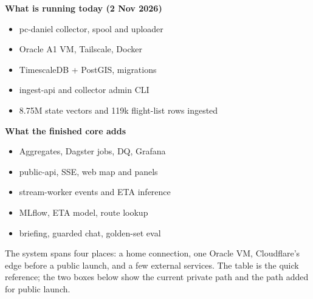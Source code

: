 \documentclass[10.5pt]{article}
\begin{document}
\begin{minipage}[t]{0.49\linewidth}
\begin{card}
{\bfseries What is running today (2 Nov 2026)}
\begin{itemize}[leftmargin=1.05em,itemsep=1.5pt,topsep=2pt]
  \item pc-daniel collector, spool and uploader
  \item Oracle A1 VM, Tailscale, Docker
  \item TimescaleDB + PostGIS, migrations
  \item ingest-api and collector admin CLI
  \item 8.75M state vectors and 119k flight-list rows ingested
\end{itemize}
\end{card}
\end{minipage}\hfill
\begin{minipage}[t]{0.49\linewidth}
\begin{card}
{\bfseries What the finished core adds}
\begin{itemize}[leftmargin=1.05em,itemsep=1.5pt,topsep=2pt]
  \item Aggregates, Dagster jobs, DQ, Grafana
  \item public-api, SSE, web map and panels
  \item stream-worker events and ETA inference
  \item MLflow, ETA model, route lookup
  \item briefing, guarded chat, golden-set eval
\end{itemize}
\end{card}
\end{minipage}

\newpage
{}

{\small
The system spans four places: a home connection, one Oracle VM, Cloudflare's edge before a public launch, and a few external services. The table is the quick reference; the two boxes below show the current private path and the path added for public launch.
}
\end{document}
